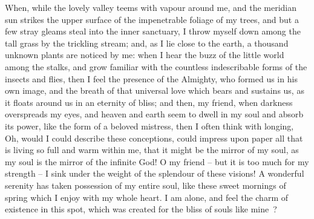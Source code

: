 When, while the lovely valley teems with vapour around me, and the meridian sun strikes the upper surface of the impenetrable foliage of my trees, and but a few stray gleams steal into the inner sanctuary, I throw myself down among the tall grass by the trickling stream; and, as I lie close to the earth, a thousand unknown plants are noticed by me: when I hear the buzz of the little world among the stalks, and grow familiar with the countless indescribable forms of the insects and flies, then I feel the presence of the Almighty, who formed us in his own image, and the breath of that universal love which bears and sustains us, as it floats around us in an eternity of bliss; and then, my friend, when darkness overspreads my eyes, and heaven and earth seem to dwell in my soul and absorb its power, like the form of a beloved mistress, then I often think with longing, Oh, would I could describe these conceptions, could impress upon paper all that is living so full and warm within me, that it might be the mirror of my soul, as my soul is the mirror of the infinite God! O my friend -- but it is too much for my strength -- I sink under the weight of the splendour of these visions! A wonderful serenity has taken possession of my entire soul, like these sweet mornings of spring which I enjoy with my whole heart. I am alone, and feel the charm of existence in this spot, which was created for the bliss of souls like mine~\cite{Abramowski:1991}?



